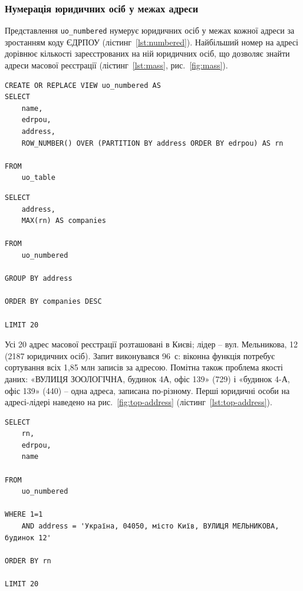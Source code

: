 \documentclass{iasa-lab}
\begin{document}
\subsubsection{Нумерація юридичних осіб у межах адреси}

Представлення \texttt{uo\_numbered} нумерує юридичних осіб у межах кожної адреси за зростанням коду ЄДРПОУ (лістинг~\ref{lst:numbered}). Найбільший номер на адресі дорівнює кількості зареєстрованих на ній юридичних осіб, що дозволяє знайти адреси масової реєстрації (лістинг~\ref{lst:mass}, рис.~\ref{fig:mass}).

\begin{lstlisting}[language=HiveQL, caption={Нумерація юридичних осіб у межах адреси}, label={lst:numbered}]
CREATE OR REPLACE VIEW uo_numbered AS
SELECT
    name,
    edrpou,
    address,
    ROW_NUMBER() OVER (PARTITION BY address ORDER BY edrpou) AS rn

FROM
    uo_table
\end{lstlisting}

\begin{lstlisting}[language=HiveQL, caption={Адреси масової реєстрації}, label={lst:mass}]
SELECT
    address,
    MAX(rn) AS companies

FROM
    uo_numbered

GROUP BY address

ORDER BY companies DESC

LIMIT 20
\end{lstlisting}


Усі 20 адрес масової реєстрації розташовані в Києві; лідер -- вул. Мельникова, 12 (2187 юридичних осіб). Запит виконувався 96~с: віконна функція потребує сортування всіх 1,85 млн записів за адресою. Помітна також проблема якості даних: «ВУЛИЦЯ ЗООЛОГІЧНА, будинок 4А, офіс 139» (729) і «будинок 4-А, офіс 139» (440) -- одна адреса, записана по-різному. Перші юридичні особи на адресі-лідері наведено на рис.~\ref{fig:top-address} (лістинг~\ref{lst:top-address}).

\begin{lstlisting}[language=HiveQL, caption={Юридичні особи на адресі масової реєстрації}, label={lst:top-address}]
SELECT
    rn,
    edrpou,
    name

FROM
    uo_numbered

WHERE 1=1
    AND address = 'Україна, 04050, місто Київ, ВУЛИЦЯ МЕЛЬНИКОВА, будинок 12'

ORDER BY rn

LIMIT 20
\end{lstlisting}
\end{document}
